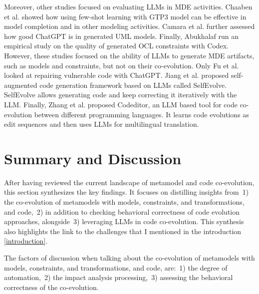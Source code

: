  Moreover, other studies focused on evaluating LLMs in MDE activities. 
 Chaaben et al. \cite{chaaben2023towards} showed how using few-shot learning with GTP3 model can be effective in model completion and in other modeling activities. 
 Camara et al. \cite{camara2023assessment} further assessed how good ChatGPT is in generated UML models.
 Finally, Abukhalaf \cite{AbukhalafHK23} run an empirical study on the quality of generated OCL constraints with Codex. However, these studies focused on the ability of LLMs to generate MDE artifacts, such as models and constraints, but not on their co-evolution. 
 Only Fu et al. \cite{fu2023chatgpt} looked at repairing vulnerable code with ChatGPT. 
 Jiang et al. \cite{jiang2023selfevolve} proposed self-augmented code generation framework based on LLMs called SelfEvolve. SelfEvolve allows generating code and keep correcting it iteratively with the LLM. %
 Finally, Zhang et al. \cite{zhang2023multilingual} proposed Codeditor, an LLM based tool for code co-evolution between different programming languages. It learns code evolutions as edit sequences and then uses LLMs for multilingual translation.
  
  \section{Summary and Discussion}
 \label{sotadiscuss}
  After having reviewed the current landscape of metamodel and code co-evolution, this section synthesizes the key findings. It focuses on distilling insights from~1) the co-evolution of metamodels with models, constraints, and transformations, and code,~2) in addition to checking behavioral correctness of code evolution approaches, alongside~3) leveraging LLMs in code co-evolution. This synthesis also highlights the link to the challenges that I mentioned in the introduction \ref{introduction}.
  
  The factors of discussion when talking about the co-evolution of metamodels with models, constraints, and transformations, and code, are:~1) the degree of automation,~2) the impact analysis processing,~3) assessing the behavioral correctness of the co-evolution.
  
